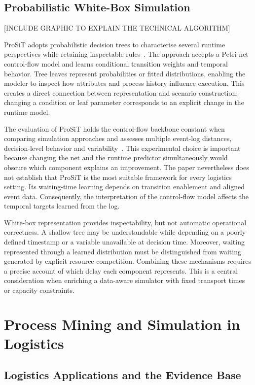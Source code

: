 \subsection{Probabilistic White-Box Simulation}
[INCLUDE GRAPHIC TO EXPLAIN THE TECHNICAL ALGORITHM]

ProSiT adopts probabilistic decision trees to characterise several runtime perspectives while retaining inspectable rules~\cite{Vinci2026prosit}. The approach accepts a Petri-net control-flow model and learns conditional transition weights and temporal behavior. Tree leaves represent probabilities or fitted distributions, enabling the modeler to inspect how attributes and process history influence execution. This creates a direct connection between representation and scenario construction: changing a condition or leaf parameter corresponds to an explicit change in the runtime model.

The evaluation of ProSiT holds the control-flow backbone constant when comparing simulation approaches and assesses multiple event-log distances, decision-level behavior and variability~\cite{Vinci2026prosit}. This experimental choice is important because changing the net and the runtime predictor simultaneously would obscure which component explains an improvement. The paper nevertheless does not establish that ProSiT is the most suitable framework for every logistics setting. Its waiting-time learning depends on transition enablement and aligned event data. Consequently, the interpretation of the control-flow model affects the temporal targets learned from the log.

White-box representation provides inspectability, but not automatic operational correctness. A shallow tree may be understandable while depending on a poorly defined timestamp or a variable unavailable at decision time. Moreover, waiting represented through a learned distribution must be distinguished from waiting generated by explicit resource competition. Combining these mechanisms requires a precise account of which delay each component represents. This is a central consideration when enriching a data-aware simulator with fixed transport times or capacity constraints.

\section{Process Mining and Simulation in Logistics}
\label{sec:rw_logistics}

\subsection{Logistics Applications and the Evidence Base}

